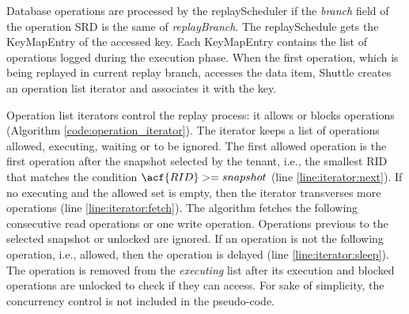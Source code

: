 Database operations are processed by the replayScheduler if the \emph{branch} field of the operation \ac{SRD} is the same of \emph{replayBranch}. The replaySchedule gets the KeyMapEntry of the accessed key. Each KeyMapEntry contains the list of operations logged during the execution phase. When the first operation, which is being replayed in current replay branch, accesses the data item, Shuttle creates an operation list iterator and associates it with the key.

Operation list iterators control the replay process: it allows or blocks operations (Algorithm \ref{code:operation_iterator}). The iterator keeps a list of operations allowed, executing, waiting or to be ignored. The first allowed operation is the first operation after the snapshot selected by the tenant, i.e., the smallest \acf{RID} that matches the condition $\acf{RID} >= snapshot$ (line \ref{line:iterator:next}). If no executing and the allowed set is empty, then the iterator transverses more operations (line \ref{line:iterator:fetch}). The algorithm fetches the following consecutive read operations or one write operation. Operations previous to the selected snapshot or unlocked are ignored. If an operation is not the following operation, i.e., allowed, then the operation is delayed (line \ref{line:iterator:sleep}). The operation is removed from the \emph{executing} list after its execution and blocked operations are unlocked to check if they can access. For sake of simplicity, the concurrency control is not included in the pseudo-code. \\

